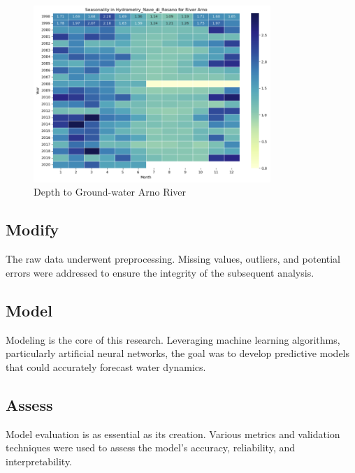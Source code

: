 \documentclass{article}
\begin{document}
\begin{figure}[h]
\centering
\includegraphics[width=0.8\textwidth]{arno_depth.png}
\caption{Depth to Ground-water Arno River}
\end{figure}

\subsection{Modify}
The raw data underwent preprocessing. Missing values, outliers, and potential errors were addressed to ensure the integrity of the subsequent analysis.

\subsection{Model}
Modeling is the core of this research. Leveraging machine learning algorithms, particularly artificial neural networks, the goal was to develop predictive models that could accurately forecast water dynamics.

\subsection{Assess}
Model evaluation is as essential as its creation. Various metrics and validation techniques were used to assess the model's accuracy, reliability, and interpretability.
\end{document}
